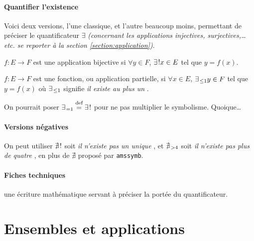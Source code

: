 \documentclass[12pt,a4paper]{article}
\theoremstyle{definition}
\begin{document}
\paragraph{Quantifier l'existence}

Voici deux versions, l'une classique, et l'autre beaucoup moins, permettant de préciser le quantificateur $\exists$ \emph{(concernant les applications injectives, surjectives,\dots{} \emph{etc.} se reporter à la section \ref{section:application})}.

\begin{tcblisting}{}
$f: E \to F$ est une application bijective si $\forall y \in F$,
$\existsone x \in E$ tel que $y = f(x)$.

$f: E \to F$ est une fonction, ou application partielle, si $\forall x \in E$,
$\existmulti{\leq 1} y \in F$ tel que $y = f(x)$ où $\existmulti{\leq 1}$ signifie
\emph{\og il existe au plus un \fg}.

On pourrait poser $\existmulti{=1} \eqdef \existsone$ pour ne pas multiplier
le symbolisme. Quoique\dots
\end{tcblisting}



\paragraph{Versions négatives}

\begin{tcblisting}{}
On peut utiliser $\nexistsone$ soit \emph{\og il n'existe pas un unique \fg},
et $\nexistmulti{>4}$ soit \emph{\og il n'existe pas plus de quatre \fg}, en plus
de $\nexists$ proposé par \verb+amssymb+.
\end{tcblisting}



\paragraph{Fiches techniques}



 une écriture mathématique servant à préciser la portée du quantificateur.


\bigskip






\section{Ensembles et applications}
\end{document}
